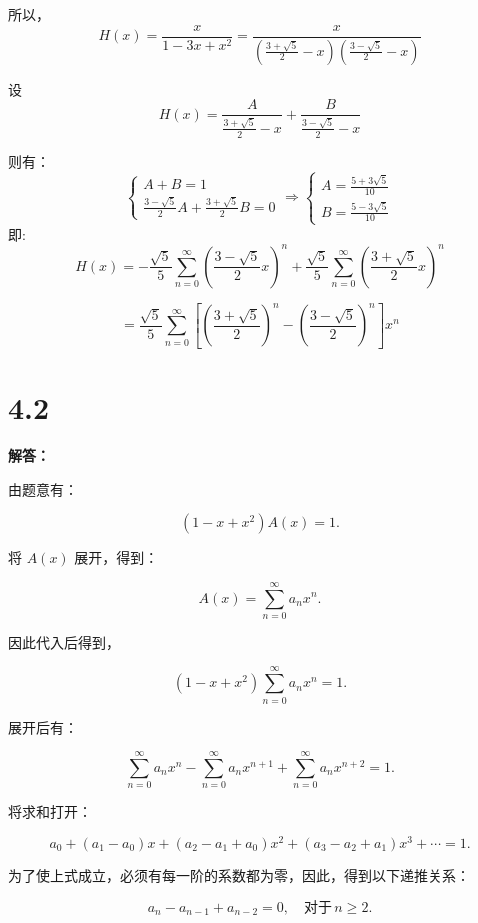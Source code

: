 \documentclass{article}
\begin{document}
    \noindent
    所以，
    \[
    H(x) = \frac{x}{1 - 3x + x^2} = \frac{x}{\left(\frac{3 + \sqrt{5}}{2} - x\right)\left(\frac{3 - \sqrt{5}}{2} - x\right)}
    \]
    
    设
    \[
    H(x) = \frac{A}{\frac{3 + \sqrt{5}}{2} - x} + \frac{B}{\frac{3 - \sqrt{5}}{2} - x}
    \]
    
    则有：
    \[
    \begin{cases}
    A + B = 1 \\
    \frac{3 - \sqrt{5}}{2} A + \frac{3 + \sqrt{5}}{2} B = 0
    \end{cases}
    \Rightarrow 
    \begin{cases}
    A = \frac{5 + 3\sqrt{5}}{10} \\
    B = \frac{5 - 3\sqrt{5}}{10}
    \end{cases}
    \]
    即:
    \[
    H(x) = -\frac{\sqrt{5}}{5} \sum_{n=0}^{\infty} \left( \frac{3 - \sqrt{5}}{2} x \right)^n + \frac{\sqrt{5}}{5} \sum_{n=0}^{\infty} \left( \frac{3 + \sqrt{5}}{2} x \right)^n
    \]
    
    \[
    \boxed{ = \frac{\sqrt{5}}{5} \sum_{n=0}^{\infty} \left[ \left( \frac{3 + \sqrt{5}}{2} \right)^n - \left( \frac{3 - \sqrt{5}}{2} \right)^n \right] x^n}
    \]

\section*{4.2}

\textbf{解答：}

由题意有：

\[
(1 - x + x^2)A(x) = 1.
\]

将 $A(x)$ 展开，得到：

\[
A(x) = \sum_{n=0}^{\infty} a_n x^n.
\]

因此代入后得到，

\[
(1 - x + x^2) \sum_{n=0}^{\infty} a_n x^n = 1.
\]

展开后有：

\[
\sum_{n=0}^{\infty} a_n x^n - \sum_{n=0}^{\infty} a_n x^{n+1} + \sum_{n=0}^{\infty} a_n x^{n+2} = 1.
\]

将求和打开：

\[
a_0 + (a_1 - a_0) x + (a_2 - a_1 + a_0) x^2 + (a_3 - a_2 + a_1) x^3 + \cdots = 1.
\]

为了使上式成立，必须有每一阶的系数都为零，因此，得到以下递推关系：

\[
a_n - a_{n-1} + a_{n-2} = 0, \quad \text{对于} \, n \geq 2.
\]
\end{document}
